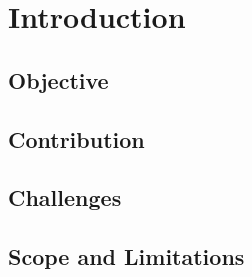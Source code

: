 
\chapter{Introduction}\label{chapter:introduction}

\section{Objective}

\section{Contribution}

\section{Challenges}

\section{Scope and Limitations}
